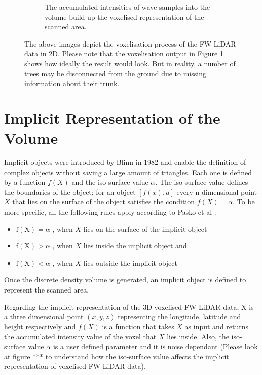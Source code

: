 \documentclass{subfiles}
\begin{document}
\begin{figure} [h!]
\begin{subfigure}[t]{.31\textwidth}
\caption{The accumulated intensities of wave samples into the volume build up the voxelised representation of the scanned area.} 
\label{fig:VoxelisationC_voxelised}
\end{subfigure}
\caption[Voxelisation of FW LiDAR data]{The above images depict the voxelisation process of the FW LiDAR data in 2D. Please note that the voxelisation output in Figure \ref{fig:VoxelisationC_voxelised} shows how ideally the result would look. But in reality, a number of trees may be disconnected from the ground due to missing information about their trunk.}
\label{fig:Voxelisation}
\end{figure}


\section{Implicit Representation of the Volume}

\par Implicit objects were introduced by Blinn in 1982 \cite{Blinn1982} and enable the definition of complex objects without saving a large amount of triangles. Each one is defined by a function $ \mathit{f(X)} $ and the iso-surface value $\alpha$. The iso-surface value defines the boundaries of the object; for an object $ [f(x),a]$ every n-dimensional point $ \mathit{X} $  that lies on the surface of the object satisfies the condition $ \mathit{f(X)=\alpha }  $. To be more specific, all the following rules apply according to Pasko et al \cite{Pasko1994}: 
\begin{itemize}
	\item $	\mathrm{f(X) = \alpha }$ , when $X$ lies on the surface of the implicit object
	\item $	\mathrm{f(X) > \alpha }$ , when $X$ lies inside the implicit object and
	\item $	\mathrm{f(X) < \alpha }$ , when $X$ lies outside the implicit object	 
\end{itemize}

\par Once the discrete density volume is generated, an implicit object is defined to represent the scanned area. 

\par Regarding the implicit representation of the 3D voxelised FW LiDAR data, X is a three dimensional point $\mathit{(x, y, z) }$ representing the longitude, latitude and height respectively and ${f(X)}$ is a function that takes  $\mathit{X}$ as input and returns the accumulated intensity value of the voxel that  $\mathit{X}$ lies inside. Also, the iso-surface value $\mathit{\alpha }$ is a user defined parameter and it is noise dependant (Please look at figure *** to understand how the iso-surface value affects the implicit representation of voxelised FW LiDAR data). 
\end{document}
